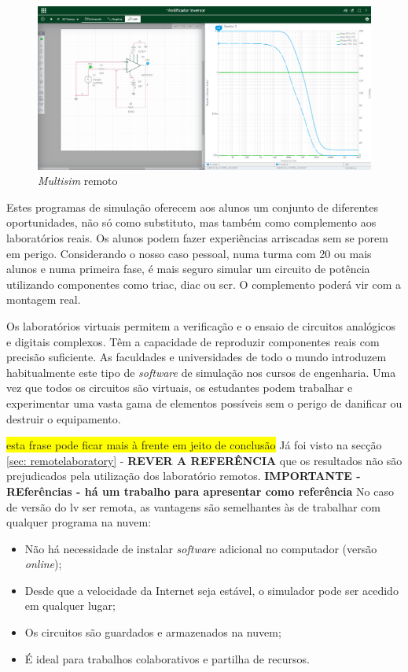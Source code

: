 \begin{figure}[hbtp]
    \centering
    \includegraphics[width=0.9\linewidth]{figures/Multisim_ACsweep.png}
    \caption{\textit{Multisim} remoto}
    \label{fig:multisimlive}
\end{figure}

Estes programas de simulação oferecem aos alunos um conjunto de diferentes oportunidades, não só como substituto, mas também como complemento aos laboratórios reais\cite{WebBrowserSimulators}. Os alunos podem fazer experiências arriscadas sem se porem em perigo. Considerando o nosso caso pessoal, numa turma com 20 ou mais alunos e numa primeira fase, é mais seguro simular um circuito de potência utilizando componentes como \gls{triac}, \gls{diac} ou \gls{scr}. O complemento poderá vir com a montagem real.

Os laboratórios virtuais permitem a verificação e o ensaio de circuitos analógicos e digitais complexos. Têm a capacidade de reproduzir componentes reais com precisão suficiente. As faculdades e universidades de todo o mundo introduzem habitualmente este tipo de \textit{software} de simulação nos cursos de engenharia. Uma vez que todos os circuitos são virtuais, os estudantes podem trabalhar e experimentar uma vasta gama de elementos possíveis sem o perigo de danificar ou destruir o equipamento.

\colorbox{yellow}{esta frase pode ficar mais à frente em jeito de conclusão}
Já foi visto na secção \ref{sec: remotelaboratory} - \textbf{REVER A REFERÊNCIA} que os resultados não são prejudicados pela utilização dos \acrshort{laboratório remoto}s. \textbf{IMPORTANTE - REferências - há um trabalho para apresentar como referência}
No caso de versão do \acrshort{lv} ser remota, as vantagens são semelhantes às de trabalhar com qualquer programa na nuvem:

\begin{itemize}
    \item Não há necessidade de instalar \textit{software} adicional no computador (versão \textit{online});
    \item Desde que a velocidade da Internet seja estável, o simulador pode ser acedido em qualquer lugar;
    \item Os circuitos são guardados e armazenados na nuvem;
    \item É ideal para trabalhos colaborativos e partilha de recursos.
\end{itemize}

